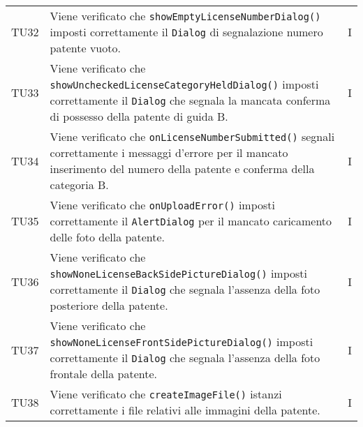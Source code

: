 \begin{longtable}{ >{\centering}p{}  >{\centering}p{} >{\centering}p{}
			}
		TU32 & Viene verificato che \texttt{showEmptyLicenseNumberDialog()} imposti correttamente il \texttt{Dialog} di segnalazione numero patente vuoto. & I 
		\tabularnewline	
		TU33 & Viene verificato che \texttt{showUncheckedLicenseCategoryHeldDialog()} imposti correttamente il \texttt{Dialog} che segnala la mancata conferma di possesso della patente di guida B. & I 
		\tabularnewline	
		TU34 & Viene verificato che \texttt{onLicenseNumberSubmitted()} segnali correttamente i messaggi d'errore per il mancato inserimento del numero della patente e conferma della categoria B. & I 
		\tabularnewline	
		TU35 & Viene verificato che \texttt{onUploadError()} imposti correttamente il \texttt{AlertDialog} per il mancato caricamento delle foto della patente. & I 
		\tabularnewline	
		TU36 & Viene verificato che \texttt{showNoneLicenseBackSidePictureDialog()} imposti correttamente il \texttt{Dialog} che segnala l'assenza della foto posteriore della patente. & I 
		\tabularnewline	
		TU37 & Viene verificato che \texttt{showNoneLicenseFrontSidePictureDialog()} imposti correttamente il \texttt{Dialog} che segnala l'assenza della foto frontale della patente. & I 
		\tabularnewline	
		TU38 & Viene verificato che \texttt{createImageFile()} istanzi correttamente i file relativi alle immagini della patente. & I  \tabularnewline	
		

\end{longtable}
